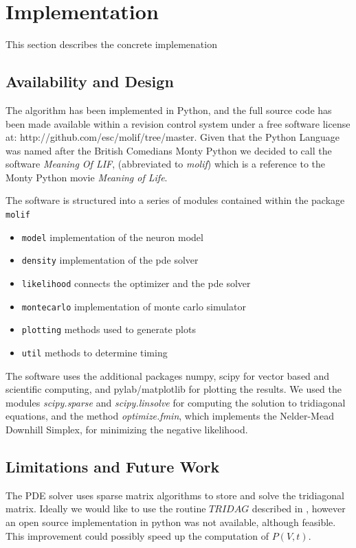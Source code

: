 \documentclass[10pt]{article}
\begin{document}
\section{Implementation}

This section describes the concrete implemenation

\subsection{Availability and Design}

The algorithm has been implemented in Python, and the full source code
has been made available within a revision control system under a free
software license at: http://github.com/esc/molif/tree/master. Given
that the Python Language was named after the British Comedians Monty
Python we decided to call the software {\it Meaning Of LIF},
(abbreviated to {\it molif}) which is a reference to the Monty Python
movie {\it Meaning of Life}. 

The software is structured into a series of modules contained within
the package {\tt molif} 

\begin{itemize}
    \item {\tt model} implementation of the neuron model
    \item {\tt density} implementation of the pde solver 
    \item {\tt likelihood} connects the optimizer and the pde solver
    \item {\tt montecarlo} implementation of monte carlo simulator
    \item {\tt plotting} methods used to generate plots
    \item {\tt util} methods to determine timing
\end{itemize}

The software uses the additional packages numpy, scipy for vector
based and scientific computing, and pylab/matplotlib for plotting the
results. We used the modules {\it scipy.sparse} and {\it
scipy.linsolve} for computing the solution to tridiagonal equations, and the
method {\it optimize.fmin}, which implements the Nelder-Mead Downhill
Simplex, for minimizing the negative likelihood.


\subsection{Limitations and Future Work}

The PDE solver uses sparse matrix algorithms to store and solve the
tridiagonal matrix. Ideally we would like to use the routine $TRIDAG$
described in \cite{press}, however an open source implementation in
python was not available, although feasible. This improvement could
possibly speed up the computation of $P(V,t)$.
\end{document}
